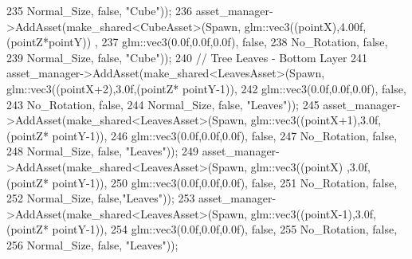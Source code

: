 \begin{DoxyCode}
235                                                            Normal\_Size, \textcolor{keyword}{false}, \textcolor{stringliteral}{"Cube"}));
236             asset\_manager->AddAsset(make\_shared<CubeAsset>(Spawn, glm::vec3((pointX),4.00f,(pointZ*pointY))
      , 
237                                                            glm::vec3(0.0f,0.0f,0.0f), \textcolor{keyword}{false},
238                                                            No\_Rotation, \textcolor{keyword}{false},
239                                                            Normal\_Size, \textcolor{keyword}{false}, \textcolor{stringliteral}{"Cube"}));
240             \textcolor{comment}{// Tree Leaves - Bottom Layer}
241             asset\_manager->AddAsset(make\_shared<LeavesAsset>(Spawn, glm::vec3((pointX+2),3.0f,(pointZ*
      pointY-1)),
242                                                              glm::vec3(0.0f,0.0f,0.0f), \textcolor{keyword}{false},
243                                                              No\_Rotation, \textcolor{keyword}{false},
244                                                              Normal\_Size, \textcolor{keyword}{false}, \textcolor{stringliteral}{"Leaves"}));
245             asset\_manager->AddAsset(make\_shared<LeavesAsset>(Spawn, glm::vec3((pointX+1),3.0f,(pointZ*
      pointY-1)),
246                                                              glm::vec3(0.0f,0.0f,0.0f), \textcolor{keyword}{false},
247                                                              No\_Rotation, \textcolor{keyword}{false},
248                                                              Normal\_Size, \textcolor{keyword}{false}, \textcolor{stringliteral}{"Leaves"}));
249             asset\_manager->AddAsset(make\_shared<LeavesAsset>(Spawn, glm::vec3((pointX)  ,3.0f,(pointZ*
      pointY-1)),
250                                                              glm::vec3(0.0f,0.0f,0.0f), \textcolor{keyword}{false},
251                                                              No\_Rotation, \textcolor{keyword}{false},
252                                                              Normal\_Size, \textcolor{keyword}{false},\textcolor{stringliteral}{"Leaves"}));
253             asset\_manager->AddAsset(make\_shared<LeavesAsset>(Spawn, glm::vec3((pointX-1),3.0f,(pointZ*
      pointY-1)),
254                                                              glm::vec3(0.0f,0.0f,0.0f), \textcolor{keyword}{false},
255                                                              No\_Rotation, \textcolor{keyword}{false},
256                                                              Normal\_Size, \textcolor{keyword}{false}, \textcolor{stringliteral}{"Leaves"}));

\end{DoxyCode}
